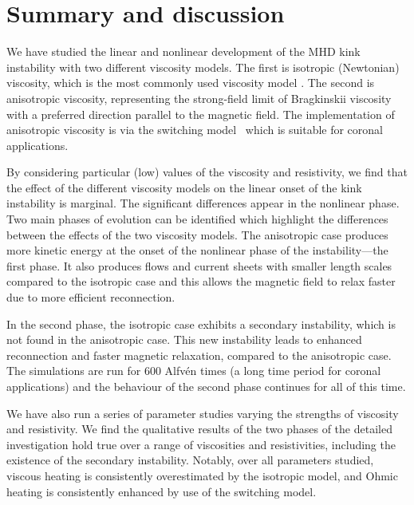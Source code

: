 \section{Summary and discussion}
\label{sec:conclusions}

We have studied the linear and nonlinear development of the MHD kink
instability with two different viscosity models. The first is
isotropic (Newtonian) viscosity, which is the most commonly used
viscosity model . The second is anisotropic viscosity, representing the strong-field limit of Bragkinskii viscosity with a preferred direction parallel to the magnetic field. The implementation of anisotropic viscosity is via the switching model~\cite{mactaggartBraginskiiMagnetohydrodynamicsArbitrary2017} which is suitable for coronal applications.

By considering particular (low) values of the viscosity and resistivity, we find that the effect of the different viscosity models on the linear onset of the kink instability is marginal. The significant differences appear in the nonlinear phase. Two main phases of evolution can be identified which highlight the differences between the effects of the two viscosity models. The anisotropic  case produces more kinetic energy at the onset of the nonlinear phase of the instability---the first phase. It also produces flows and current sheets with smaller length scales compared to the isotropic case and this allows the magnetic field to relax faster due to more efficient reconnection. 

In the second phase, the isotropic case exhibits a secondary instability, which is not found in the anisotropic case. This new instability leads to enhanced reconnection and faster magnetic relaxation, compared to the anisotropic case.  The simulations are run for $600$ Alfv\'en times (a long time period for coronal applications) and the behaviour of the second phase continues for all of this time.

We have also run a series of parameter studies varying the strengths of viscosity and resistivity. We find the qualitative results of the two phases of the detailed investigation hold true over a range of viscosities and resistivities, including the existence of the secondary instability. Notably, over all parameters studied, viscous heating is consistently overestimated by the isotropic model, and Ohmic heating is consistently enhanced by use of the switching model.

